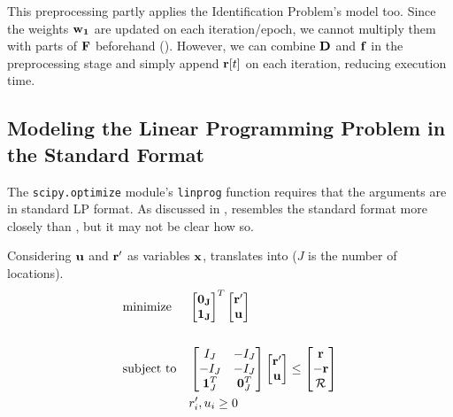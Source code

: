 This preprocessing partly applies the Identification Problem's model too. Since the weights $\mathbf{w_1}$ are updated on each iteration/epoch, we cannot multiply them with parts of $\mathbf{F}$ beforehand (). However, we can combine $\mathbf{D}$ and $\mathbf{f}$ in the preprocessing stage and simply append $\mathbf{r}[t]$ on each iteration, reducing execution time.

\subsection{Modeling the Linear Programming Problem in the Standard Format} \label{app:Modeling the Linear Programming Problem in the Standard Format}
The \texttt{scipy.optimize} module's \texttt{linprog} function requires that the arguments are in standard LP format. As discussed in ,  resembles the standard format more closely than , but it may not be clear how so.

Considering $\mathbf{u}$ and $\mathbf{r'}$ as variables $\mathbf{x}$,  translates into  ($J$ is the number of locations).
\begin{equation} \label{eqn:lp_matrix_rewards}
\begin{aligned}
& \text{minimize}
& & \begin{bmatrix}
\mathbf{0_J}\\
\mathbf{1_J}\\
\end{bmatrix}^T
\begin{bmatrix}
\mathbf{r'}\\
\mathbf{u}
\end{bmatrix}\\ \\
& \text{subject to}
& & \begin{bmatrix}
I_J & -I_J\\
-I_J & -I_J\\
\mathbf{1}^T_J & \mathbf{0}^T_J\\
\end{bmatrix}
\begin{bmatrix}
\mathbf{r'}\\
\mathbf{u}\\
\end{bmatrix} \leq
\begin{bmatrix}
\mathbf{r}\\
-\mathbf{r}\\
\mathcal{R}\\
\end{bmatrix}\\
&&& r'_i, u_i \geq 0
\end{aligned}
\end{equation}

